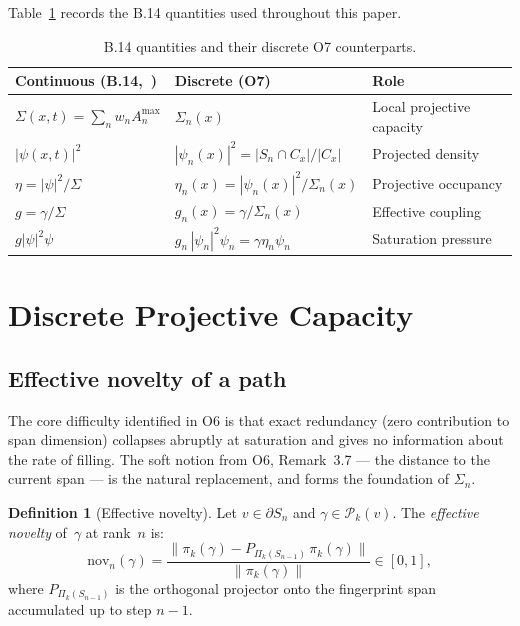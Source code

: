 \documentclass[11pt,a4paper]{article}
\theoremstyle{definition}
\newtheorem{definition}[theorem]{Definition}
\theoremstyle{remark}
\newcommand{\Pik}{\Pi_k}
\newcommand{\nov}{\mathrm{nov}}
\newcommand{\Pk}{\mathcal{P}_k}
\begin{document}
    Table~\ref{tab:dict} records the B.14 quantities used throughout this paper.

    \begin{table}[ht]
      \centering
      \caption{B.14 quantities and their discrete O7 counterparts.}
      \label{tab:dict}
      \begin{tabular}{lll}
        \toprule
        Continuous (B.14,~\cite{Cosmochrony}) & Discrete (O7) & Role
        \\
        \midrule
        $\Sigma(x,t) = \sum_n w_n A_n^{\max}$ & $\Sigma_n(x)$ & Local projective capacity
        \\
        $|\psi(x,t)|^2$ & $|\psi_n(x)|^2 = |S_n\cap C_x|/|C_x|$ & Projected density
        \\
        $\eta = |\psi|^2/\Sigma$ & $\eta_n(x) = |\psi_n(x)|^2/\Sigma_n(x)$ & Projective occupancy
        \\
        $g = \gamma/\Sigma$ & $g_n(x) = \gamma/\Sigma_n(x)$ & Effective coupling
        \\
        $g|\psi|^2\psi$ & $g_n\,|\psi_n|^2\psi_n = \gamma\eta_n\psi_n$ & Saturation pressure
        \\
        \bottomrule
      \end{tabular}
    \end{table}

  \section{Discrete Projective Capacity}
  \label{sec:Sigma}

  \subsection{Effective novelty of a path}
    \label{ssec:novelty}

    The core difficulty identified in O6 is that exact redundancy (zero contribution to span
    dimension) collapses abruptly at saturation and gives no information about the rate of filling.
    The soft notion from O6, Remark~3.7 --- the distance to the current span --- is the natural
    replacement, and forms the foundation of $\Sigma_n$.

    \begin{definition}[Effective novelty]
      \label{def:novelty}
      Let $v \in \partial S_n$ and $\gamma \in \Pk(v)$.
      The \emph{effective novelty} of~$\gamma$ at rank~$n$ is:
      \begin{equation}
        \label{eq:novelty}
        \nov_n(\gamma)
        = \frac{\|\pi_k(\gamma) - P_{\Pik(S_{n-1})}\,\pi_k(\gamma)\|}{\|\pi_k(\gamma)\|}
        \in [0,1],
      \end{equation}
      where $P_{\Pik(S_{n-1})}$ is the orthogonal projector onto the fingerprint span
      accumulated up to step $n-1$.
    \end{definition}
\end{document}
